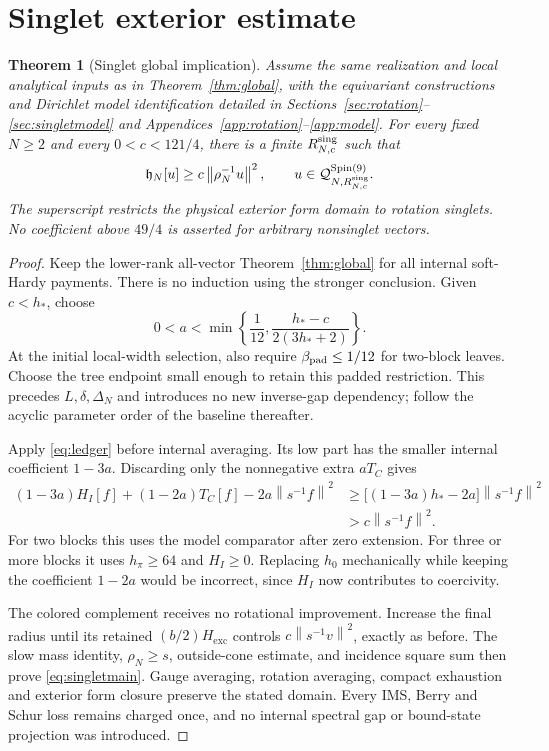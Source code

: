 \documentclass[11pt,letterpaper]{article}
\newtheorem{theorem}{Theorem}[section]
\theoremstyle{definition}\newtheorem{hypothesis}[theorem]{Hypothesis}
\newcommand{\exc}{\mathrm{exc}}
\newcommand{\hh}{\mathfrak h}
\newcommand{\QQ}{\mathcal Q}
\newcommand{\norm}[1]{\left\lVert #1\right\rVert}
\numberwithin{equation}{section}
\begin{document}
\section{Singlet exterior estimate}\label{sec:sharptheorem}
\begin{theorem}[Singlet global implication]\label{thm:singlet}
Assume the same realization and local analytical inputs as in Theorem~\ref{thm:global}, with the equivariant constructions and Dirichlet model identification detailed in Sections~\ref{sec:rotation}--\ref{sec:singletmodel} and Appendices~\ref{app:rotation}--\ref{app:model}. For every fixed $N\ge2$ and every $0<c<121/4$, there is a finite $R^{\rm sing}_{N,c}$ such that
\begin{equation}
 \hh_N[u]\ge c\norm{\rho_N^{-1}u}^2,
 \qquad u\in\QQ_{N,R^{\rm sing}_{N,c}}^{\operatorname{Spin}(9)}.
 \label{eq:singletmain}
\end{equation}
The superscript restricts the physical exterior form domain to rotation singlets. No coefficient above $49/4$ is asserted for arbitrary nonsinglet vectors.
\end{theorem}
\begin{proof}
Keep the lower-rank all-vector Theorem~\ref{thm:global} for all internal soft-Hardy payments. There is no induction using the stronger conclusion. Given $c<h_*$, choose
\begin{equation}
 0<a<\min\left\{\frac1{12},\frac{h_*-c}{2(3h_*+2)}\right\}.
\end{equation}
At the initial local-width selection, also require $\beta_{\rm pad}\le1/12$ for two-block leaves. Choose the tree endpoint small enough to retain this padded restriction. This precedes $L,\delta,\Delta_N$ and introduces no new inverse-gap dependency; follow the acyclic parameter order of the baseline thereafter.

Apply \eqref{eq:ledger} before internal averaging. Its low part has the smaller internal coefficient $1-3a$. Discarding only the nonnegative extra $aT_C$ gives
\begin{align}
 (1-3a)H_I[f]+(1-2a)T_C[f]-2a\norm{s^{-1}f}^2
 &\ge\bigl[(1-3a)h_*-2a\bigr]\norm{s^{-1}f}^2\nonumber\\
 &>c\norm{s^{-1}f}^2.\label{eq:sharpledger}
\end{align}
For two blocks this uses the model comparator after zero extension. For three or more blocks it uses $h_\pi\ge64$ and $H_I\ge0$. Replacing $h_0$ mechanically while keeping the coefficient $1-2a$ would be incorrect, since $H_I$ now contributes to coercivity.

The colored complement receives no rotational improvement. Increase the final radius until its retained $(b/2)H_{\exc}$ controls $c\norm{s^{-1}v}^2$, exactly as before. The slow mass identity, $\rho_N\ge s$, outside-cone estimate, and incidence square sum then prove \eqref{eq:singletmain}. Gauge averaging, rotation averaging, compact exhaustion and exterior form closure preserve the stated domain. Every IMS, Berry and Schur loss remains charged once, and no internal spectral gap or bound-state projection was introduced.
\end{proof}
\end{document}
